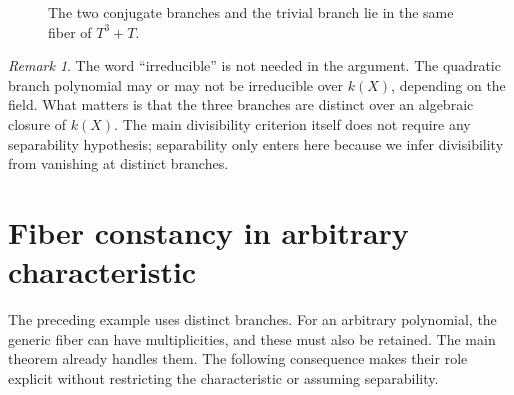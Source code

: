 \documentclass[11pt]{article}
\theoremstyle{plain}
\theoremstyle{definition}
\theoremstyle{remark}
\newtheorem{remark}[theorem]{Remark}
\begin{document}
\begin{figure}[h]
\centering
{}
\caption{The two conjugate branches and the trivial branch lie in the same fiber of \(T^3+T\).}
\label{fig:branches}
\end{figure}

\begin{remark}
The word ``irreducible'' is not needed in the argument. The quadratic branch polynomial may or may not be irreducible over \(k(X)\), depending on the field. What matters is that the three branches are distinct over an algebraic closure of \(k(X)\). The main divisibility criterion itself does not require any separability hypothesis; separability only enters here because we infer divisibility from vanishing at distinct branches.
\end{remark}

\section{Fiber constancy in arbitrary characteristic}
\label{sec:fiber-multiplicity}

The preceding example uses distinct branches. For an arbitrary polynomial, the generic fiber can have multiplicities, and these must also be retained. The main theorem already handles them. The following consequence makes their role explicit without restricting the characteristic or assuming separability.
\end{document}
